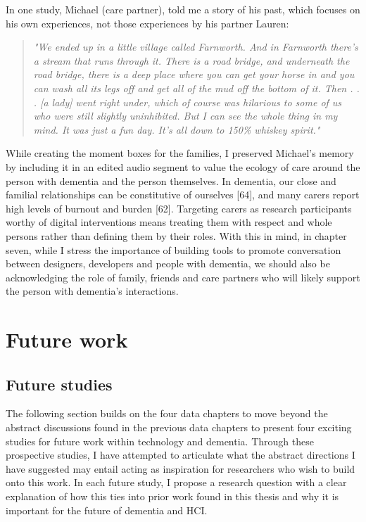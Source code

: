 In one study, Michael (care partner), told me a story of his past, which focuses on his own experiences, not those experiences by his partner Lauren:
\begin{quote}
\textit{"We ended up in a little village called Farnworth. And in Farnworth there's a stream that runs through it. There is a road bridge, and underneath the road bridge, there is a deep place where you can get your horse in and you can wash all its legs off and get all of the mud off the bottom of it. Then . . . [a lady] went right under, which of course was hilarious to some of us who were still slightly uninhibited. But I can see the whole thing in my mind. It was just a fun day. It's all down to 150\% whiskey spirit."}
\end{quote}
While creating the moment boxes for the families, I preserved Michael's memory by including it in an edited audio segment to value the ecology of care around the person with dementia and the person themselves. In dementia, our close and familial relationships can be constitutive of ourselves [64], and many carers report high levels of burnout and burden [62]. Targeting carers as research participants worthy of digital interventions means treating them with respect and whole persons rather than defining them by their roles. With this in mind, in chapter seven, while I stress the importance of building tools to promote conversation between designers, developers and people with dementia, we should also be acknowledging the role of family, friends and care partners who will likely support the person with dementia's interactions. 






\section{Future work}
\label{FutureWork}

\subsection{Future studies}
\label{FutureStudies}
The following section builds on the four data chapters to move beyond the abstract discussions found in the previous data chapters to present four exciting studies for future work within technology and dementia. Through these prospective studies, I have attempted to articulate what the abstract directions I have suggested may entail acting as inspiration for researchers who wish to build onto this work. In each future study, I propose a research question with a clear explanation of how this ties into prior work found in this thesis and why it is important for the future of dementia and HCI.

